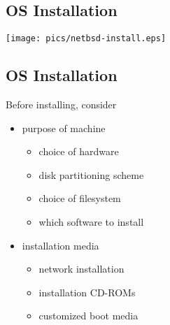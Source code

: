 \documentclass[xga]{xdvislides}
\begin{document}
\subsection{OS Installation}
\begin{center}
	\texttt{[image: pics/netbsd-install.eps]}
\end{center}

\subsection{OS Installation}
Before installing, consider
\begin{itemize}
	\item purpose of machine
		\begin{itemize}
			\item choice of hardware
			\item disk partitioning scheme
			\item choice of filesystem
			\item which software to install
		\end{itemize}
	\item installation media
		\begin{itemize}
			\item network installation
			\item installation CD-ROMs
			\item customized boot media
		\end{itemize}
\end{itemize}
\end{document}

